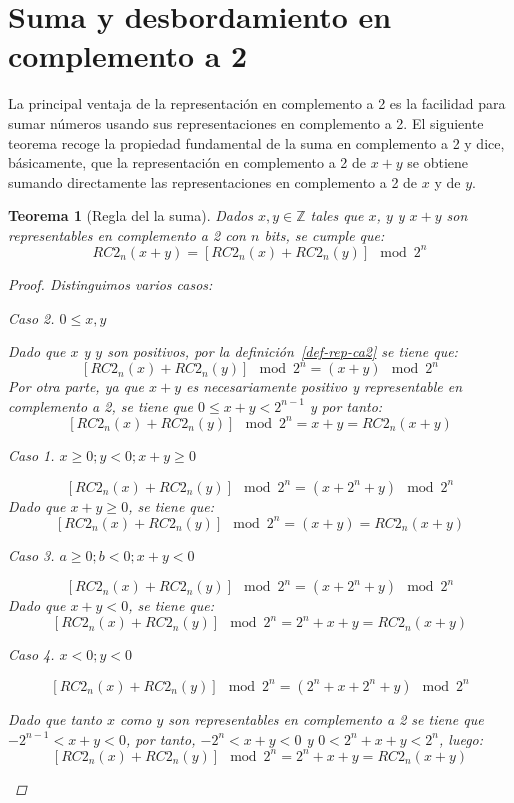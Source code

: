 \documentclass[spanish,a4paper,12pt,titlepage]{article}
\newtheorem{theorem}{Teorema}%
\theoremstyle{definition}
\theoremstyle{remark}
\newtheorem{case}{Caso}
\newcommand{\bbZ}{\mathbb{Z}}
\begin{document}
\section{Suma y desbordamiento en complemento a 2}

La principal ventaja de la representación en complemento a 2 es la facilidad para sumar números usando sus representaciones en complemento a 2. El siguiente teorema recoge la propiedad fundamental de la suma en complemento a 2 y dice, básicamente, que la representación en complemento a 2 de $x+y$ se obtiene sumando directamente las representaciones en complemento a 2 de $x$ y de $y$.

\begin{theorem}[Regla del la suma]\label{theorem-sum-law}
  Dados $x, y \in \bbZ$ tales que $x$, $y$ y $x+y$ son representables en complemento a 2 con $n$ bits, se cumple que:
  \[
    RC2_n(x+y) = [RC2_n(x) + RC2_n(y)] \mod 2^n
  \]
  \begin{proof}
    Distinguimos varios casos:

    \begin{case}
      $0 \le x,y$

      Dado que $x$ y $y$ son positivos, por la definición~\ref{def-rep-ca2} se tiene que:
      \[
        [RC2_n(x)+RC2_n(y)] \mod 2^n = (x + y) \mod 2^n
      \]
      Por otra parte, ya que $x+y$ es necesariamente positivo y representable en complemento a 2, se tiene que $0 \le x + y < 2^{n-1}$ y por tanto:
      \[
        [RC2_n(x)+RC2_n(y)] \mod 2^n = x + y = RC2_n(x+y)
      \]

      \begin{case}
        $x \ge 0; y < 0; x+y \ge 0$
      \end{case}

      \[
        [RC2_n(x)+RC2_n(y)] \mod 2^n = (x + 2^n + y) \mod 2^n
      \]
      Dado que $x+y \ge 0$, se tiene que:
      \[
        [RC2_n(x)+RC2_n(y)] \mod 2^n = (x + y) = RC2_n(x+y)
      \]
    \end{case}
    \begin{case}
      $a \ge 0; b < 0; x+y < 0$

      \[
        [RC2_n(x)+RC2_n(y)] \mod 2^n = (x + 2^n + y) \mod 2^n
      \]
      Dado que $x+y < 0$, se tiene que:
      \[
        [RC2_n(x)+RC2_n(y)] \mod 2^n = 2^n + x + y = RC2_n(x + y)
      \]
    \end{case}

    \begin{case}
      $x < 0; y < 0$

      \[
        [RC2_n(x)+RC2_n(y)] \mod 2^n = (2^n + x + 2^n + y) \mod 2^n
      \]

      Dado que tanto $x$ como $y$ son representables en complemento a 2
      se tiene que $-2^{n-1} < x+y < 0$, por tanto, $-2^n < x+y < 0$
      y $0 < 2^n + x + y < 2^n$, luego:
      \[
        [RC2_n(x)+RC2_n(y)] \mod 2^n = 2^n + x + y = RC2_n(x + y)
      \]
    \end{case}
  \end{proof}
\end{theorem}
\end{document}
